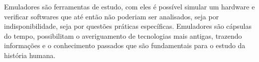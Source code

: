 \documentclass[12pt]{article}
\begin{document}
Emuladores são ferramentas de estudo, com eles é possível simular um hardware e
verificar softwares que até então não poderiam ser analisados, seja por
indisponibilidade, seja por questões práticas específicas. Emuladores são cápsulas
do tempo, possibilitam o averiguamento de tecnologias mais antigas, trazendo
informações e o conhecimento passados que são fundamentais para o estudo da
história humana.



\end{document}
